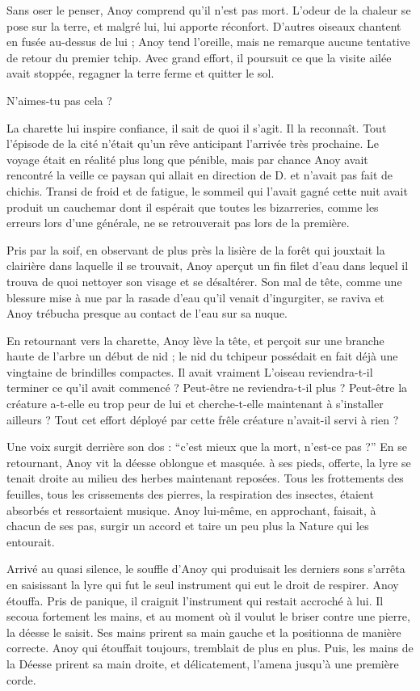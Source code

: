 Sans oser le penser, Anoy comprend qu'il n'est pas mort. L'odeur de la
chaleur se pose sur la terre, et malgré lui, lui apporte
réconfort. D'autres oiseaux chantent en fusée au-dessus de lui ; Anoy
tend l'oreille, mais ne remarque aucune tentative de retour du premier
tchip. Avec grand effort, il poursuit ce que la visite ailée avait
stoppée, regagner la terre ferme et quitter le sol.

N'aimes-tu pas cela ?

La charette lui inspire confiance, il sait de quoi il s'agit. Il la
reconnaît. Tout l'épisode de la cité n'était qu'un rêve anticipant
l'arrivée très prochaine. Le voyage était en réalité plus long que
pénible, mais par chance Anoy avait rencontré la veille ce paysan qui
allait en direction de D. et n'avait pas fait de chichis. Transi de
froid et de fatigue, le sommeil qui l'avait gagné cette nuit avait
produit un cauchemar dont il espérait que toutes les bizarreries,
comme les erreurs lors d'une générale, ne se retrouverait pas lors de
la première.

Pris par la soif, en observant de plus près la lisière de la
forêt qui jouxtait la clairière dans laquelle il se trouvait, Anoy
aperçut un fin filet d'eau dans lequel il trouva de quoi nettoyer son
visage et se désaltérer. Son mal de tête, comme une blessure mise à
nue par la rasade d'eau qu'il venait d'ingurgiter, se raviva et Anoy
trébucha presque au contact de l'eau sur sa nuque.

En retournant vers la charette, Anoy lève la tête, et perçoit sur une
branche haute de l'arbre un début de nid ; le nid du tchipeur
possédait en fait déjà une vingtaine de brindilles compactes. Il avait
vraiment  L'oiseau reviendra-t-il terminer ce qu'il avait commencé ?
Peut-être ne reviendra-t-il plus ?  Peut-être la créature a-t-elle eu
trop peur de lui et cherche-t-elle maintenant à s'installer ailleurs ?
Tout cet effort déployé par cette frêle créature n'avait-il servi à
rien ?

Une voix surgit derrière son dos : ``c'est mieux que la mort, n'est-ce
pas ?'' En se retournant, Anoy vit la déesse oblongue et masquée. à
ses pieds, offerte, la lyre se tenait droite au milieu des herbes
maintenant reposées. Tous les frottements des feuilles, tous les
crissements des pierres, la respiration des insectes, étaient absorbés
et ressortaient musique. Anoy lui-même, en approchant, faisait, à
chacun de ses pas, surgir un accord et taire un peu plus la Nature qui
les entourait.

Arrivé au quasi silence, le souffle d'Anoy qui produisait les derniers
sons s'arrêta en saisissant la lyre qui fut le seul instrument qui eut
le droit de respirer. Anoy étouffa. Pris de panique, il craignit
l'instrument qui restait accroché à lui. Il secoua fortement les
mains, et au moment où il voulut le briser contre une pierre, la
déesse le saisit. Ses mains prirent sa main gauche et la positionna de
manière correcte. Anoy qui étouffait toujours, tremblait de plus en
plus. Puis, les mains de la Déesse prirent sa main droite, et
délicatement, l'amena jusqu'à une première corde.

